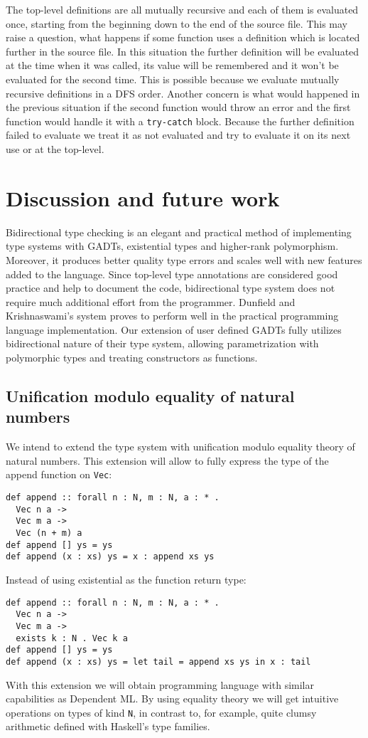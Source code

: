 \documentclass[declaration,shortabstract,english]{iithesis}
\begin{document}
The top-level definitions are all mutually recursive and each of them is evaluated once, starting from the beginning
down to the end of the source file. This may raise a question, what happens if some function uses a definition which is located
further in the source file. In this situation the further definition will be evaluated at the time when it was called,
its value will be remembered and it won't be evaluated for the second time. This is possible because we evaluate mutually recursive
definitions in a DFS order.
Another concern is what would happened in the previous situation if the second function would throw an error and the first function would
handle it with a \verb+try-catch+ block. Because the further definition failed to evaluate we treat it as not evaluated and try to evaluate it
on its next use or at the top-level.

\chapter{Discussion and future work}
Bidirectional type checking is an elegant and practical method of implementing type systems with GADTs,
existential types and higher-rank polymorphism. Moreover, it produces better quality type errors
and scales well with new features added to the language. Since top-level type annotations are considered
good practice and help to document the code, bidirectional type system does not require much additional effort from the programmer.
Dunfield and Krishnaswami's system\cite{gadt-popl19} proves to perform well in the practical programming language implementation.
Our extension of user defined GADTs fully utilizes bidirectional nature of their type system,
allowing parametrization with polymorphic types and treating constructors as functions.

\section{Unification modulo equality of natural numbers}\label{natural}
We intend to extend the type system with unification modulo equality theory of natural numbers.
This extension will allow to fully express the type of the append function on \verb+Vec+:
\begin{verbatim}
def append :: forall n : N, m : N, a : * .
  Vec n a ->
  Vec m a ->
  Vec (n + m) a
def append [] ys = ys
def append (x : xs) ys = x : append xs ys
\end{verbatim}
Instead of using existential as the function return type:
\begin{verbatim}
def append :: forall n : N, m : N, a : * .
  Vec n a ->
  Vec m a ->
  exists k : N . Vec k a
def append [] ys = ys
def append (x : xs) ys = let tail = append xs ys in x : tail
\end{verbatim}
With this extension we will obtain programming language with similar capabilities as
Dependent ML\cite{DependentML}. By using equality theory we will get intuitive operations
on types of kind \verb+N+, in contrast to, for example, quite clumsy arithmetic
defined with Haskell's type families.
\end{document}
